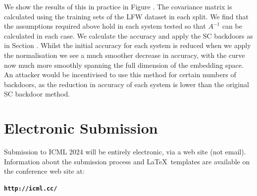 \documentclass{article}
\theoremstyle{plain}
\theoremstyle{definition}
\theoremstyle{remark}
\begin{document}
We show the results of this in practice in Figure . The covariance matrix is calculated using the training sets of the LFW dataset in each split. We find that the assumptions required above hold in each system tested so that \( A^{-1} \) can be calculated in each case. We calculate the accuracy and apply the SC backdoors as in Section . Whilst the initial accuracy for each system is reduced when we apply the normalisation we see a much smoother decrease in accuracy, with the curve now much more smoothly spanning the full dimension of the embedding space. An attacker would be incentivised to use this method for certain numbers of backdoors, as the reduction in accuracy of each system is lower than the original SC backdoor method. 

\section{Electronic Submission}
\label{submission}

Submission to ICML 2024 will be entirely electronic, via a web site
(not email). Information about the submission process and \LaTeX\ templates
are available on the conference web site at:
\begin{center}
\textbf{\texttt{http://icml.cc/}}
\end{center}
\end{document}
